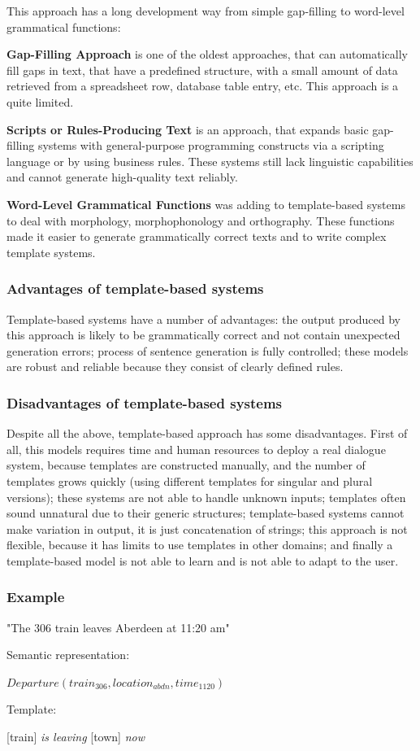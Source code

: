 This approach has a long development way from simple gap-filling to word-level grammatical functions:

\textbf{Gap-Filling Approach} is one of the oldest approaches, that can automatically fill gaps in text, that have a predefined structure, with a small amount of data retrieved from a spreadsheet row, database table entry, etc. This approach is a quite limited.

\textbf{Scripts or Rules-Producing Text} is an approach, that expands basic gap-filling systems with general-purpose programming constructs via a scripting language or by using business rules. These systems still lack linguistic capabilities and cannot generate high-quality text reliably.

\textbf{Word-Level Grammatical Functions} was adding to template-based systems to deal with morphology, morphophonology and orthography. These functions made it easier to generate grammatically correct texts and to write complex template systems.

\subsubsection{Advantages of template-based systems}
Template-based systems have a number of advantages: the output produced by this approach is likely to be grammatically correct and not contain unexpected generation errors; process of sentence generation is fully controlled; these models are robust and reliable because they consist of clearly defined rules.

\subsubsection{Disadvantages of template-based systems}
Despite all the above, template-based approach has some disadvantages. First of all, this models requires time and human resources to deploy a real dialogue system, because templates are constructed manually, and the number of templates grows quickly (using different templates for singular and plural versions); these systems are not able to handle unknown inputs; templates often sound unnatural due to their generic structures; template-based systems cannot make variation in output, it is just concatenation of strings; this approach is not flexible, because it has limits to use templates in other domains; and finally a template-based model is not able to learn and is not able to adapt to the user.

\begin{center}
\subsubsection{Example}\label{tb_example} 
"The 306 train leaves Aberdeen at 11:20 am"

\vspace{5mm}
Semantic representation: 

$Departure(train_{306}, location_{abdn}, time_{1120})$

\vspace{5mm}
Template: 

[train] \textit{is leaving} [town] \textit{now}
\end{center}

